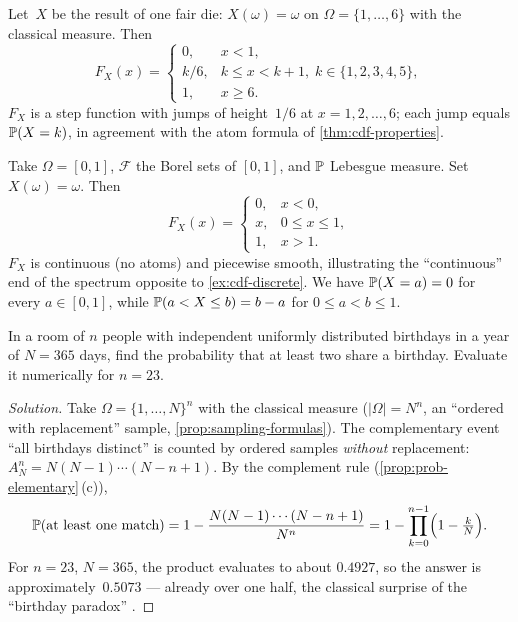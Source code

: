 \begin{example}
\label{ex:cdf-discrete}
Let~$X$ be the result of one fair die: $X(\omega) = \omega$ on
$\Omega = \{1, \dots, 6\}$ with the classical measure. Then
\[
  F_X(x) = \begin{cases}
    0, & x < 1, \\
    k/6, & k \leq x < k + 1,\; k \in \{1, 2, 3, 4, 5\}, \\
    1, & x \geq 6.
  \end{cases}
\]
$F_X$ is a step function with jumps of height~$1/6$ at $x = 1, 2, \dots, 6$;
each jump equals $\mathbb{P}(X = k)$, in agreement with the atom formula
of \cref{thm:cdf-properties}.
\end{example}

\begin{example}
\label{ex:cdf-uniform}
Take $\Omega = [0, 1]$, $\mathcal{F}$ the Borel sets of $[0, 1]$, and
$\mathbb{P}$ Lebesgue measure. Set $X(\omega) = \omega$. Then
\[
  F_X(x) = \begin{cases}
    0, & x < 0, \\
    x, & 0 \leq x \leq 1, \\
    1, & x > 1.
  \end{cases}
\]
$F_X$ is continuous (no atoms) and piecewise smooth, illustrating the
``continuous'' end of the spectrum opposite to
\cref{ex:cdf-discrete}. We have $\mathbb{P}(X = a) = 0$ for every
$a \in [0, 1]$, while $\mathbb{P}(a < X \leq b) = b - a$ for $0 \leq a < b \leq 1$.
\end{example}

\begin{problem}
\label{prob:birthday-pair}
In a room of $n$ people with independent uniformly distributed
birthdays in a year of $N = 365$ days, find the probability that at
least two share a birthday. Evaluate it numerically for $n = 23$.
\end{problem}

\begin{proof}[Solution]
Take $\Omega = \{1, \dots, N\}^n$ with the classical measure
($|\Omega| = N^n$, an ``ordered with replacement'' sample,
\cref{prop:sampling-formulas}). The complementary event ``all
birthdays distinct'' is counted by ordered samples \emph{without}
replacement: $A_N^n = N(N-1)\cdots(N-n+1)$. By the complement rule
(\cref{prop:prob-elementary}\,(c)),
\[
  \mathbb{P}(\text{at least one match}) = 1 - \frac{N(N-1)\cdots(N-n+1)}{N^n}
  = 1 - \prod_{k=0}^{n-1}\Bigl(1 - \tfrac{k}{N}\Bigr).
\]
For $n = 23$, $N = 365$, the product evaluates to about $0.4927$, so
the answer is approximately~$0.5073$ — already over one half, the
classical surprise of the ``birthday paradox''
\cite[\S~II.4]{GnedenkoKhinchin1970}.
\end{proof}

